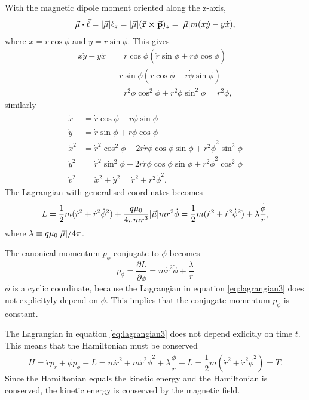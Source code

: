 \documentclass[11pt]{amsart}
\begin{document}
With the magnetic dipole moment oriented along the z-axis, 
\begin{align*}
\va{\mu}\vdot\va{\ell} = \abs{\va{\mu}}\ell_z = \abs{\va{\mu}}(\va{r}\cp\va{p})_z = \abs{\va{\mu}}m(x\dot{y}-y\dot{x}),
\end{align*} 
where $x = r\cos\phi$ and $y = r\sin\phi$. This gives
\begin{align*}
x\dot{y} - y\dot{x} &= r\cos\phi(\dot{r}\sin\phi + r\dot{\phi}\cos\phi) \\
					&- r\sin\phi(\dot{r}\cos\phi - r\dot{\phi}\sin\phi) \\
					&= r^2\phi\cos^2\phi + r^2\phi\sin^2\phi = r^2\phi,
\end{align*} 
similarly
\begin{align*}
\dot{x} &= \dot{r}\cos\phi - r\dot{\phi}\sin\phi \\
\dot{y} &= \dot{r}\sin\phi + r\dot{\phi}\cos\phi \\
\dot{x}^2 &= \dot{r}^2\cos^2\phi - 2r\dot{r}\dot{\phi}\cos\phi\sin\phi + r^2\dot{\phi}^2\sin^2\phi \\
\dot{y}^2 &= \dot{r}^2\sin^2\phi + 2r\dot{r}\dot{\phi}\cos\phi\sin\phi + r^2\dot{\phi}^2\cos^2\phi \\
\dot{v}^2 &= \dot{x}^2 + \dot{y}^2 = \dot{r}^2 + r^2\dot{\phi}^2.
\end{align*}
The Lagrangian with generalised coordinates becomes
\begin{equation}
\label{eq:lagrangian3}
L = \frac{1}{2}m(\dot{r}^2 + \dot{r}^2\dot{\phi}^2) + \frac{q\mu_0}{4\pi mr^3}\abs{\va{\mu}}mr^2\dot{\phi} = \frac{1}{2}m(\dot{r}^2 + \dot{r}^2\dot{\phi}^2) + \lambda\frac{\dot{\phi}}{r},
\end{equation}
where $\lambda \equiv q\mu_0\abs{\va{\mu}}/4\pi$. 

The canonical momentum $p_\phi$ conjugate to $\phi$ becomes
\begin{equation}
p_\phi = \frac{\partial L}{\partial \dot{\phi}} = m\dot{r}^2\dot{\phi} + \frac{\lambda}{r}
\end{equation}
$\phi$ is a cyclic coordinate, because the Lagrangian in equation \ref{eq:lagrangian3} does not explicityly depend on $\phi$. This implies that the conjugate momentum $p_\phi$ is constant. 

The Lagrangian in equation \ref{eq:lagrangian3} does not depend exlicitly on time $t$. This means that the Hamiltonian must be conserved
\begin{equation}
H = \dot{r}p_r + \dot{\phi}p_\phi - L = m\dot{r}^2 + m\dot{r}^2\dot{\phi}^2 + \lambda\frac{\dot{\phi}}{r} - L = \frac{1}{2}m(\dot{r}^2 + \dot{r}^2\dot{\phi}^2) = T.
\end{equation}
Since the Hamiltonian equals the kinetic energy and the Hamiltonian is conserved, the kinetic energy is conserved by the magnetic field.
\end{document}
